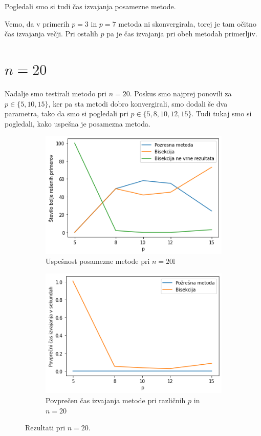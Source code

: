 \documentclass[a4paper]{article}
\begin{document}
Pogledali smo si tudi čas izvajanja posamezne metode. 

Vemo, da v primerih $p = 3$ in $p = 7$ metoda ni skonvergirala, torej je tam očitno čas izvajanja večji. Pri ostalih $p$ pa je čas izvajanja pri obeh metodah primerljiv.

\section{$n = 20$}
Nadalje smo testirali metodo pri $n = 20$. Poskus smo najprej ponovili za $p \in \{5, 10, 15\}$, ker pa sta metodi dobro konvergirali, smo dodali še dva parametra, tako da smo si pogledali pri $p \in \{5, 8, 10, 12, 15\}$. Tudi tukaj smo si pogledali, kako uspešna je posamezna metoda. 

\begin{figure}[h]
	\begin{subfigure}[t]{0.45\textwidth}
		\centering
		\includegraphics[width=\textwidth]{n_20.png}
		\caption{Uspešnost posamezne metode pri $n = 20$l}
		\label{n_20_count}
	\end{subfigure}
	\hfill
	\begin{subfigure}[t]{0.45\textwidth}
		\centering
		\includegraphics[width=\textwidth]{n_20_time.png}
		\caption{Povprečen čas izvajanja metode pri različnih $p$ in $n = 20$}
		\label{n_20_time}
	\end{subfigure}
    \caption{Rezultati pri $n = 20$.}
    \label{fig:n_20}
\end{figure}
\end{document}
